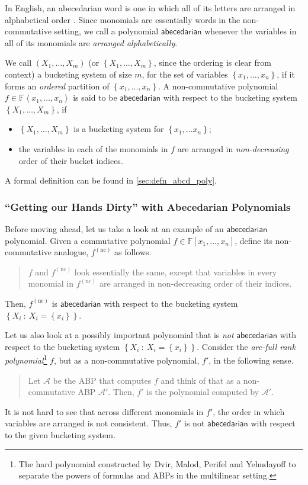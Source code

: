 \documentclass[10pt,a4paper]{article}
\def\Field{\mathbb{F}}
\let\F\Field
\def\set#1{\left\{ #1 \right\}}
\def\inbrace#1{\left\{ #1 \right\}}
\def\inangle#1{\left\langle #1 \right\rangle}
\def\setdef#1#2{\inbrace{ #1 \ : \ #2}}
\newcommand{\abp}{\textbf{$\mathcal{A}$}}
\newcommand{\abcd}{\mathsf{abecedarian}}
\begin{document}
In English, an abecedarian word is one in which all of its letters are arranged in alphabetical order \cite{MW19}. 
Since monomials are essentially words in the non-commutative setting, we call a polynomial $\abcd$ whenever the variables in all of its monomials are \emph{arranged alphabetically}.
%

We call $(X_1, \ldots, X_m)$ (or $\set{X_1, \ldots, X_m}$, since the ordering is clear from context) a bucketing system of size $m$, for the set of variables $\set{x_1, \ldots, x_n}$, if it forms an \emph{ordered} partition of $\set{x_1, \ldots, x_n}$.
A non-commutative polynomial $f \in \F \inangle{x_1, \ldots, x_n}$ is said to be $\abcd$ with respect to the bucketing system $\set{X_1, \ldots, X_m}$, if 
\begin{itemize}
	\item $\set{X_1, \ldots, X_m}$ is a bucketing system for $\set{x_1, \ldots x_n}$;
	\item the variables in each of the monomials in $f$ are arranged in \emph{non-decreasing} order of their bucket indices. 
\end{itemize}
A formal definition can be found in \autoref{sec:defn_abcd_poly}.

\subsubsection*{``Getting our Hands Dirty'' with Abecedarian Polynomials}

Before moving ahead, let us take a look at an example of an $\abcd$ polynomial.
Given a commutative polynomial $f \in \F[x_1, \ldots, x_n]$, define its non-commutative analogue, $f^{(\text{nc})}$ as follows.
\begin{quote}
	$f$ and $f^{(\text{nc})}$ look essentially the same, except that variables in every monomial in $f^{(\text{nc})}$ are arranged in non-decreasing order of their indices.
\end{quote}
Then, $f^{(\text{nc})}$ is $\abcd$ with respect to the bucketing system $\setdef{X_i}{X_i = \set{x_i}}$. 

Let us also look at a possibly important polynomial that is \emph{not} $\abcd$ with respect to the bucketing system $\setdef{X_i}{X_i = \set{x_i}}$.
Consider the \emph{arc-full rank polynomial}\footnote{The hard polynomial constructed by Dvir, Malod, Perifel and Yehudayoff \cite{DMPY12} to separate the powers of formulas and ABPs in the multilinear setting.} $f$, but as a non-commutative polynomial, $f'$, in the following sense. 
\begin{quote}
	Let $\abp$ be the ABP that computes $f$ and think of that as a non-commutative ABP $\abp'$. Then, $f'$ is the polynomial computed by $\abp'$. 
\end{quote}
It is not hard to see that across different monomials in $f'$, the order in which variables are arranged is not consistent.
Thus, $f'$ is not $\abcd$ with respect to the given bucketing system.
\end{document}

